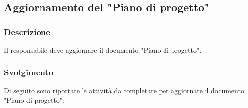 \subsection{Aggiornamento del "Piano di progetto"}
\label{aggiornare-pdp}

\subsubsection{Descrizione}

Il responsabile deve aggiornare il documento "Piano di progetto".

\subsubsection{Svolgimento}
Di seguito sono riportate le attività da completare per aggiornare il documento
"Piano di progetto":
